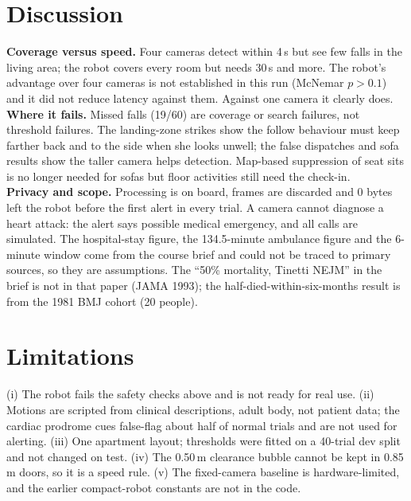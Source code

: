 \documentclass[11pt,twocolumn]{article}
\begin{document}
\section{Discussion}
\textbf{Coverage versus speed.} Four cameras detect within 4\,s but see few falls in the living area; the robot covers every room but needs 30\,s and more. The robot's advantage over four cameras is not established in this run (McNemar $p>0.1$) and it did not reduce latency against them. Against one camera it clearly does.\\
\textbf{Where it fails.} Missed falls (19/60) are coverage or search failures, not threshold failures. The landing-zone strikes show the follow behaviour must keep farther back and to the side when she looks unwell; the false dispatches and sofa results show the taller camera helps detection. Map-based suppression of seat sits is no longer needed for sofas but floor activities still need the check-in.\\
\textbf{Privacy and scope.} Processing is on board, frames are discarded and 0 bytes left the robot before the first alert in every trial. A camera cannot diagnose a heart attack: the alert says possible medical emergency, and all calls are simulated. The hospital-stay figure, the 134.5-minute ambulance figure and the 6-minute window come from the course brief and could not be traced to primary sources, so they are assumptions. The ``50\% mortality, Tinetti NEJM'' in the brief is not in that paper (JAMA 1993); the half-died-within-six-months result is from the 1981 BMJ cohort (20 people).
\section{Limitations}
(i) The robot fails the safety checks above and is not ready for real use. (ii) Motions are scripted from clinical descriptions, adult body, not patient data; the cardiac prodrome cues false-flag about half of normal trials and are not used for alerting. (iii) One apartment layout; thresholds were fitted on a 40-trial dev split and not changed on test. (iv) The 0.50\,m clearance bubble cannot be kept in 0.85\,m doors, so it is a speed rule. (v) The fixed-camera baseline is hardware-limited, and the earlier compact-robot constants are not in the code.
\end{document}
